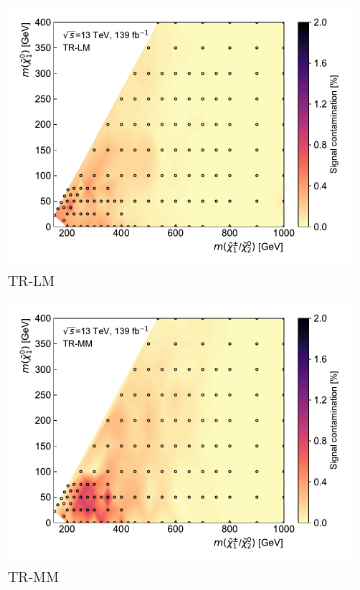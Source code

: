  \begin{figure}
	\centering
	\begin{subfigure}[b]{0.5\linewidth}
		\centering\includegraphics[width=1.0\textwidth]{signal_contamination/plot_TR_LM}
		\caption{TR-LM\label{fig:signal_contamination_TRLM}}
	\end{subfigure}\hfill
	\begin{subfigure}[b]{0.5\linewidth}
		\centering\includegraphics[width=1.0\textwidth]{signal_contamination/plot_TR_MM}
		\caption{TR-MM\label{fig:signal_contamination_TRMM}}
	\end{subfigure}\hfill
	\begin{subfigure}[b]{0.5\linewidth}

\end{subfigure}
\end{figure}
